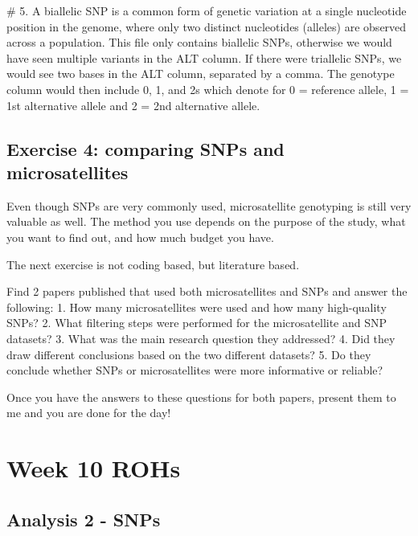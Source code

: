 \documentclass[
  letterpaper,
  DIV=11,
  numbers=noendperiod]{scrreprt}
\newenvironment{Shaded}{}{}
\newcommand{\CommentTok}[1]{\textcolor[rgb]{0.42,0.45,0.49}{#1}}
\begin{document}
\begin{tcolorbox}
\begin{Shaded}
\begin{Highlighting}[]
\CommentTok{\# 5. A biallelic SNP is a common form of genetic variation at a single nucleotide position in the genome, where only two distinct nucleotides (alleles) are observed across a population. This file only contains biallelic SNPs, otherwise we would have seen multiple variants in the \textquotesingle{}ALT\textquotesingle{} column. If there were triallelic SNPs, we would see two bases in the ALT column, separated by a comma. The genotype column would then include 0, 1, and 2\textquotesingle{}s which denote for 0 = reference allele, 1 = 1st alternative allele and 2 = 2nd alternative allele.}
\end{Highlighting}
\end{Shaded}

\end{tcolorbox}

\section{Exercise 4: comparing SNPs and
microsatellites}\label{exercise-4-comparing-snps-and-microsatellites}

Even though SNPs are very commonly used, microsatellite genotyping is
still very valuable as well. The method you use depends on the purpose
of the study, what you want to find out, and how much budget you have.

The next exercise is not coding based, but literature based.

Find 2 papers published that used both microsatellites and SNPs and
answer the following: 1. How many microsatellites were used and how many
high-quality SNPs? 2. What filtering steps were performed for the
microsatellite and SNP datasets? 3. What was the main research question
they addressed? 4. Did they draw different conclusions based on the two
different datasets? 5. Do they conclude whether SNPs or microsatellites
were more informative or reliable?

Once you have the answers to these questions for both papers, present
them to me and you are done for the day!


\chapter{Week 10 ROHs}\label{week-10-rohs}

\section{Analysis 2 - SNPs}\label{analysis-2---snps}
\end{document}
